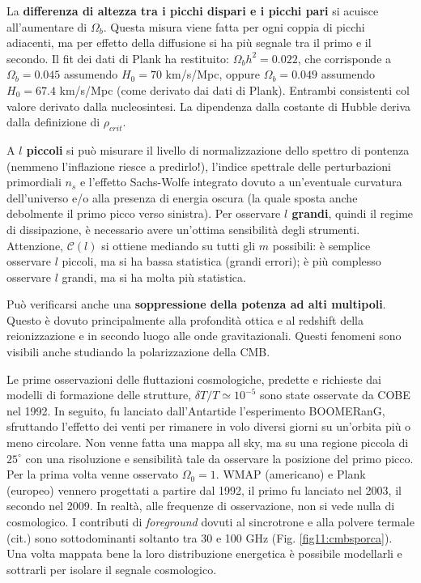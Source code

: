 La \textbf{differenza di altezza tra i picchi dispari e i picchi pari} si acuisce all'aumentare di $\Omega_b$. Questa misura viene fatta per ogni coppia di picchi adiacenti, ma per effetto della diffusione si ha più segnale tra il primo e il secondo. Il fit dei dati di Plank ha restituito: $\Omega_b h^2 = 0.022$, che corrisponde a $\Omega_b =0.045$ assumendo $H_0=70$ km/s/Mpc, oppure $\Omega_b =0.049$ assumendo $H_0=67.4$ km/s/Mpc (come derivato dai dati di Plank). Entrambi consistenti col valore derivato dalla nucleosintesi. La dipendenza dalla costante di Hubble deriva dalla definizione di $\rho_{crit}$.

A \textbf{$l$ piccoli} si può misurare il livello di normalizzazione dello spettro di pontenza (nemmeno l'inflazione riesce a predirlo!), l'indice spettrale delle perturbazioni primordiali $n_s$ e l'effetto Sachs-Wolfe integrato dovuto a un'eventuale curvatura dell'universo e/o alla presenza di energia oscura (la quale sposta anche debolmente il primo picco verso sinistra). Per osservare \textbf{$l$ grandi}, quindi il regime di dissipazione, è necessario avere un'ottima sensibilità degli strumenti. Attenzione, $\mathcal{C}(l)$ si ottiene mediando su tutti gli $m$ possibili: è semplice osservare $l$ piccoli, ma si ha bassa statistica (grandi errori); è più complesso osservare $l$ grandi, ma si ha molta più statistica.

Può verificarsi anche una \textbf{soppressione della potenza ad alti multipoli}. Questo è dovuto principalmente alla profondità ottica e al redshift della reionizzazione e in secondo luogo alle onde gravitazionali. Questi fenomeni sono visibili anche studiando la polarizzazione della CMB. 

Le prime osservazioni delle fluttazioni cosmologiche, predette e richieste dai modelli di formazione delle strutture, $\delta T / T \simeq 10^{-5}$ sono state osservate da COBE nel 1992. In seguito, fu lanciato dall'Antartide l'esperimento BOOMERanG, sfruttando l'effetto dei venti per rimanere in volo diversi giorni su un'orbita più o meno circolare. Non venne fatta una mappa all sky, ma su una regione piccola di $25^\circ $ con una risoluzione e sensibilità tale da osservare la posizione del primo picco. Per la prima volta venne osservato $\Omega_0 =1$. WMAP (americano) e Plank (europeo) vennero progettati a partire dal 1992, il primo fu lanciato nel 2003, il secondo nel 2009. In realtà, alle frequenze di osservazione, non si vede nulla di cosmologico. I contributi di \textit{foreground} dovuti al sincrotrone e alla polvere termale (cit.) sono sottodominanti soltanto tra 30 e 100 GHz (Fig. \ref{fig11:cmbsporca}). Una volta mappata bene la loro distribuzione energetica è possibile modellarli e sottrarli per isolare il segnale cosmologico.

